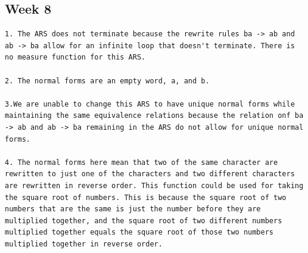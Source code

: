 \documentclass{article}
\theoremstyle{theorem}
\theoremstyle{definition}
\theoremstyle{remark}
\begin{document}
\subsection{Week 8}
\begin{verbatim}
1. The ARS does not terminate because the rewrite rules ba -> ab and ab -> ba allow for an infinite loop that doesn't terminate. There is no measure function for this ARS. 

2. The normal forms are an empty word, a, and b. 

3.We are unable to change this ARS to have unique normal forms while maintaining the same equivalence relations because the relation onf ba -> ab and ab -> ba remaining in the ARS do not allow for unique normal forms. 

4. The normal forms here mean that two of the same character are rewritten to just one of the characters and two different characters are rewritten in reverse order. This function could be used for taking the square root of numbers. This is because the square root of two numbers that are the same is just the number before they are multiplied together, and the square root of two different numbers multiplied together equals the square root of those two numbers multiplied together in reverse order.
\end{verbatim}
\end{document}
